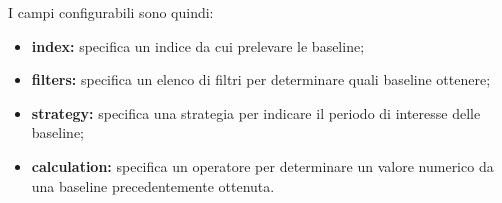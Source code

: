 	I campi configurabili sono quindi:

	\begin{itemize}
                \item \textbf{index:} specifica un indice da cui prelevare le baseline;
                \item \textbf{filters:} specifica un elenco di filtri per determinare quali baseline ottenere;
                \item \textbf{strategy:} specifica una strategia per indicare il periodo di interesse delle baseline;
                \item \textbf{calculation:} specifica un operatore per determinare un valore numerico da una baseline precedentemente ottenuta.
	\end{itemize}
